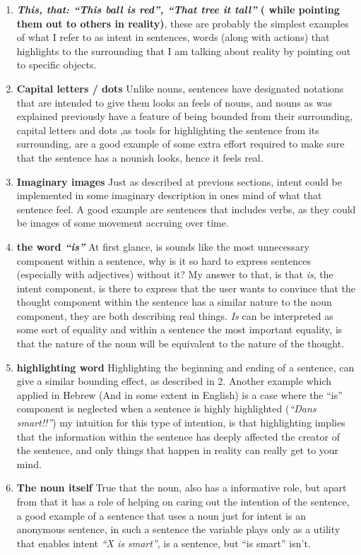 \documentclass[10pt]{article}
\begin{document}
\begin{enumerate}
\item
\textbf{\textit{This, that: “This ball is red”, “That tree it tall”} ( while pointing them out to others  in reality)}, these are probably the simplest examples of what I refer to as intent in sentences, words (along with actions) that highlights to the surrounding that I am talking about reality by pointing out to specific objects.
\item
\textbf{Capital letters / dots} Unlike nouns, sentences have designated notations that are intended to give them looks an feels of nouns, and nouns as was explained previously have  a feature of being bounded from their surrounding, capital letters and dots ,as tools for highlighting the sentence from its surrounding, are a good example of some extra effort  required to make sure that the sentence has a nounish looks, hence it feels real.
\item
\textbf{Imaginary images} Just as described at previous sections, intent could be implemented in some imaginary description in ones mind of what that sentence feel. A good example are sentences that includes verbs, as they could be images of some movement accruing over time.
\item
\textbf{the word \textit{“is” }} At first glance, is sounds like the most unnecessary component within a sentence,  why is it so hard to express sentences (especially with adjectives) without it? My answer to that, is that \textit{is}, the intent component, is there to express that the user wants to convince that the thought component within the sentence has a similar nature to the noun component, they are both describing real things. \textit{Is} can be interpreted as some sort of equality and within a sentence the most  important equality, is that the nature of the noun will be equivalent to the nature of the thought.
\item
\textbf{highlighting word} Highlighting the beginning and ending of a sentence,  can give a similar bounding effect, as described in 2. Another example which applied in Hebrew (And in some extent in English) is a case where the “is” component is neglected when a sentence is highly highlighted (\textit{“Dans smart!!”}) my intuition for this type of intention, is that highlighting implies that the information within the sentence has deeply affected the creator of the sentence, and only things that  happen in reality can really get to your mind.
\item
\textbf{The noun itself} True that the noun, also has a informative role, but apart from that it has a role of helping on caring out the intention of the sentence, a good example of a sentence that uses a noun just for intent is an anonymous sentence, in such a sentence the variable plays only as a utility that enables intent \textit{“X is smart”}, is a sentence, but “is smart” isn't.
\end{enumerate}
\end{document}

